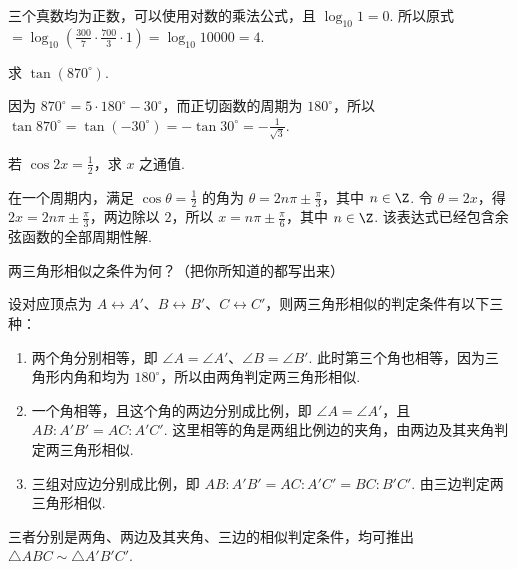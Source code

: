 \documentclass[UTF8,a4paper,oneside,11pt]{ctexbook}
\begin{document}
\begin{solution}
三个真数均为正数，可以使用对数的乘法公式，且 \(\log_{10}1=0\). 所以原式 \(=\log_{10}\left(\frac{300}{7}\cdot\frac{700}{3}\cdot1\right)=\log_{10}10000=4\).
\end{solution}

\begin{problem}
求 \(\tan\left(870^{\circ}\right)\).
\end{problem}

\begin{solution}
因为 \(870^{\circ}=5\cdot180^{\circ}-30^{\circ}\)，而正切函数的周期为 \(180^{\circ}\)，所以 \(\tan870^{\circ}=\tan\left(-30^{\circ}\right)=-\tan30^{\circ}=-\frac{1}{\sqrt{3}}\).
\end{solution}

\begin{problem}
若 \(\cos2x=\frac{1}{2}\)，求 \(x\) 之通值.
\end{problem}

\begin{solution}
在一个周期内，满足 \(\cos\theta=\frac12\) 的角为 \(\theta=2n\pi\pm\frac\pi3\)，其中 \(n\in\Z\). 令 \(\theta=2x\)，得 \(2x=2n\pi\pm\frac\pi3\)，两边除以 \(2\)，所以 \(x=n\pi\pm\frac\pi6\)，其中 \(n\in\Z\). 该表达式已经包含余弦函数的全部周期性解.
\end{solution}

\begin{problem}
两三角形相似之条件为何？（把你所知道的都写出来）
\end{problem}

\begin{solution}
设对应顶点为 \(A\leftrightarrow A'\)、\(B\leftrightarrow B'\)、\(C\leftrightarrow C'\)，则两三角形相似的判定条件有以下三种：
\begin{enumerate}
\item 两个角分别相等，即 \(\angle A=\angle A'\)、\(\angle B=\angle B'\). 此时第三个角也相等，因为三角形内角和均为 \(180^{\circ}\)，所以由两角判定两三角形相似.
\item 一个角相等，且这个角的两边分别成比例，即 \(\angle A=\angle A'\)，且 \(AB:A'B'=AC:A'C'\). 这里相等的角是两组比例边的夹角，由两边及其夹角判定两三角形相似.
\item 三组对应边分别成比例，即 \(AB:A'B'=AC:A'C'=BC:B'C'\). 由三边判定两三角形相似.
\end{enumerate}
三者分别是两角、两边及其夹角、三边的相似判定条件，均可推出 \(\triangle ABC\sim\triangle A'B'C'\).
\end{solution}
\end{document}
